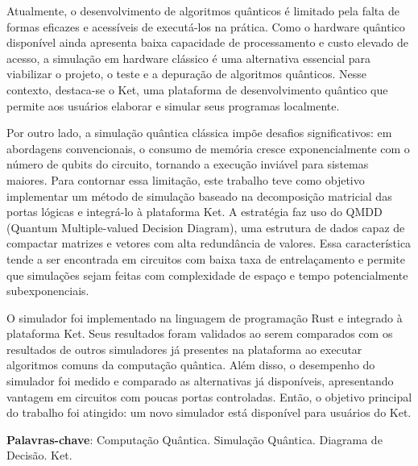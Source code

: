 \setlength{\absparsep}{18pt} %
\begin{resumo}
  Atualmente, o desenvolvimento de algoritmos quânticos é limitado pela falta de formas eficazes e acessíveis de executá-los na prática. Como o hardware quântico disponível ainda apresenta baixa capacidade de processamento e custo elevado de acesso, a simulação em hardware clássico é uma alternativa essencial para viabilizar o projeto, o teste e a depuração de algoritmos quânticos. Nesse contexto, destaca-se o Ket, uma plataforma de desenvolvimento quântico que permite aos usuários elaborar e simular seus programas localmente.

  Por outro lado, a simulação quântica clássica impõe desafios significativos: em abordagens convencionais, o consumo de memória cresce exponencialmente com o número de qubits do circuito, tornando a execução inviável para sistemas maiores. Para contornar essa limitação, este trabalho teve como objetivo implementar um método de simulação baseado na decomposição matricial das portas lógicas e integrá-lo à plataforma Ket. A estratégia faz uso do QMDD (Quantum Multiple-valued Decision Diagram), uma estrutura de dados capaz de compactar matrizes e vetores com alta redundância de valores. Essa característica tende a ser encontrada em circuitos com baixa taxa de entrelaçamento e permite que simulações sejam feitas com complexidade de espaço e tempo potencialmente subexponenciais.

  O simulador foi implementado na linguagem de programação Rust e integrado à plataforma Ket. Seus resultados foram validados ao serem comparados com os resultados de outros simuladores já presentes na plataforma ao executar algoritmos comuns da computação quântica. Além disso, o desempenho do simulador foi medido e comparado as alternativas já disponíveis, apresentando vantagem em circuitos com poucas portas controladas. Então, o objetivo principal do trabalho foi atingido: um novo simulador está disponível para usuários do Ket.

  \textbf{Palavras-chave}: Computação Quântica. Simulação Quântica. Diagrama de Decisão. Ket.
\end{resumo}

